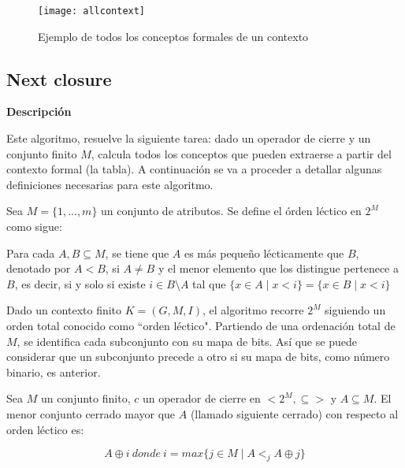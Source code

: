         \begin{figure}[H]
            \centering
            \texttt{[image: allcontext]}
            \caption{Ejemplo de todos los conceptos formales de un contexto}
            \label{fig:allcontext}
        \end{figure}

        \clearpage



\subsection{Next closure}

        \textbf{Descripci\'on}

        Este algoritmo, resuelve la siguiente tarea: dado un operador de cierre y un conjunto finito \(M\), calcula todos los 
        conceptos que pueden extraerse a partir del contexto formal (la tabla). A continuaci\'on se va a proceder a detallar 
        algunas definiciones necesarias para este algoritmo.

        \bigskip

        Sea \(M=\{1, ..., m\}\) un conjunto de atributos. Se define el \'orden l\'ectico en \(2^M\) como sigue: 
        
        Para cada \(A,B \subseteq M\), se tiene que \(A\) 
        es m\'as peque\~no l\'ecticamente que \(B\), denotado por \(A < B\), si \(A \neq B\) y el menor elemento que los distingue 
        pertenece a \(B\), es decir, si y solo si existe \(i \in B \setminus A \) tal que \( \{x \in A \mid x < i\} = \{x \in B 
        \mid x < i\} \)

        \bigskip

        Dado un contexto finito \( K=(G, M, I) \), el algoritmo recorre \(2^M\) siguiendo un orden total conocido como ``orden l\'ectico". 
        Partiendo de una ordenaci\'on total de \(M\), se identifica cada subconjunto con su mapa de bits. As\'i que se puede considerar 
        que un subconjunto precede a otro si su mapa de bits, como n\'umero binario, es anterior.
    
        \bigskip

        Sea \(M\) un conjunto finito, \(c\) un operador de cierre en \(<2^M, \subseteq > \) y \(A \subseteq M \). El menor 
        conjunto cerrado mayor que \(A\) (llamado siguiente cerrado) con respecto al orden l\'ectico es:

        \[
            A \oplus i ~ donde ~ i = max \{j \in M \mid A <_{j} A \oplus j \}
        \]

